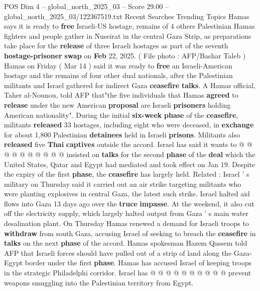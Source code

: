 \begin{textsample}{POS Dim 4 – global\_north\_2025\_03 – Score 29.00 – global\_north\_2025\_03/122367519.txt}  \label{ex:f4_pos_070}
Recent Searches Trending Topics Hamas says it is ready to \textbf{free} Israeli-US hostage, remains of 4 others Palestinian Hamas fighters and people gather in Nuseirat in the central Gaza Strip, as preparations take place for the \textbf{release} of three Israeli hostages as part of the seventh \textbf{hostage-prisoner} \textbf{swap} on \textbf{Feb} 22, 2025. ( File photo : AFP/Bashar Taleb ) Hamas on Friday ( Mar 14 ) said it was ready to \textbf{free} an Israeli-American hostage and the remains of four other dual nationals, after the Palestinian militants and Israel gathered for indirect Gaza \textbf{ceasefire} \textbf{talks}.
A Hamas official, Taher al-Nounou, told AFP that"the five individuals that Hamas \textbf{agreed} to \textbf{release} under the new American \textbf{proposal} are Israeli \textbf{prisoners} holding American nationality".
During the initial \textbf{six-week} \textbf{phase} of the \textbf{ceasefire}, militants \textbf{released} 33 hostages, including eight who were deceased, in \textbf{exchange} for about 1,800 Palestinian \textbf{detainees} held in Israeli \textbf{prisons}.
Militants also \textbf{released} five \textbf{Thai} \textbf{captives} outside the accord.
Israel has said it wants to @ @ @ @ @ @ @ @ @ @ insisted on \textbf{talks} for the second \textbf{phase} of the \textbf{deal} which the United States, Qatar and Egypt had mediated and took effect on Jan 19.
Despite the expiry of the first \textbf{phase}, the \textbf{ceasefire} has largely held.
Related : Israel ' s military on Thursday said it carried out an air strike targeting militants who were planting explosives in central Gaza, the latest such strike.
Israel halted aid flows into Gaza 13 days ago over the \textbf{truce} \textbf{impasse}.
At the weekend, it also cut off the electricity supply, which largely halted output from Gaza ' s main water desalination plant.
On Thursday Hamas renewed a demand for Israeli troops to \textbf{withdraw} from south Gaza, accusing Israel of seeking to breach the \textbf{ceasefire} in \textbf{talks} on the next \textbf{phase} of the accord.
Hamas spokesman Hazem Qassem told AFP that Israeli forces should have pulled out of a strip of land along the Gaza-Egypt border under the first \textbf{phase}.
Hamas has accused Israel of keeping troops in the strategic Philadelphi corridor.
Israel has @ @ @ @ @ @ @ @ @ @ prevent weapons smuggling into the Palestinian territory from Egypt.

\end{textsample}
